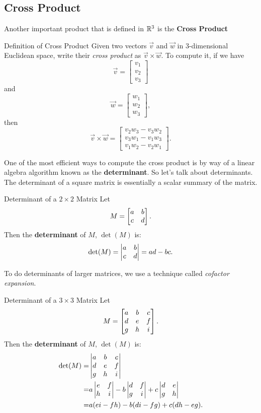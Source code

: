 \subsection{Cross Product}

Another important product that is defined in $\mathbb{R}^3$ is the \textbf{Cross Product}

\begin{definition}{Definition of Cross Product}
Given two vectors $\vec{v}$ and $\vec{w}$ in $3$-dimensional Euclidean space, write their \emph{cross product} as $\vec{v}\times \vec{w}$.  To compute it, if we have $$\vec{v}=\begin{bmatrix} v_1 \\ v_2 \\  v_3\end{bmatrix}$$ and $$\vec{w}=\begin{bmatrix} w_1 \\ w_2 \\ w_3\end{bmatrix},$$ then $$\vec{v}\times \vec{w}=\begin{bmatrix} v_2w_3-v_3w_2 \\ v_3w_1-v_1w_3 \\ v_1w_2-v_2w_1 \end{bmatrix}.$$ 
\end{definition}

One of the most efficient ways to compute the cross product is by way of a linear algebra algorithm known as the \textbf{determinant}. \hypertarget{det}{So let's talk about determinants}. The determinant of a square matrix is essentially a scalar summary of the matrix.

\begin{definition}{Determinant of a $2\times 2$ Matrix}
Let $$M=\begin{bmatrix}a&b\\c&d\end{bmatrix}. $$ Then the \textbf{determinant} of $M$, $\det(M)$ is:
$$\det(M)=\begin{vmatrix}a&b\\c&d\end{vmatrix}=ad-bc. $$
\end{definition}

To do determinants of larger matrices, we use a technique called \textit{cofactor expansion}.

\begin{definition}{Determinant of a $3\times 3$ Matrix}
Let $$ M=\begin{bmatrix}a&b&c\\d&e&f\\g&h&i\end{bmatrix}. $$ Then the \textbf{determinant} of $M$, $\det(M)$ is:
\begin{align*}
\det(M)=&\begin{vmatrix}a&b&c\\d&e&f\\g&h&i\end{vmatrix}\\
=&a\begin{vmatrix}e&f\\h&i\end{vmatrix}-b\begin{vmatrix}d&f\\g&i\end{vmatrix}+c\begin{vmatrix}d&e\\g&h\end{vmatrix}\\
=&a(ei-fh)-b(di-fg)+c(dh-eg).
\end{align*}
\end{definition}

